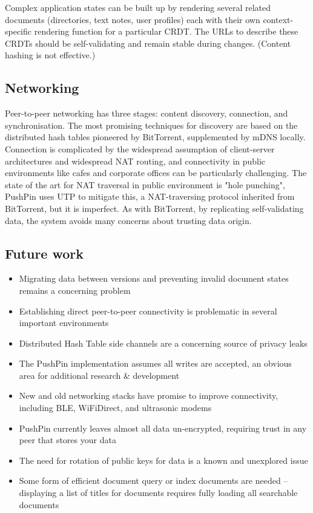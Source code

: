 \documentclass[sigplan,10pt]{acmart}
\begin{document}
Complex application states can be built up by rendering several related documents (directories, text notes, user profiles) each with their own context-specific rendering function for a particular CRDT. The URLs to describe these CRDTs should be self-validating and remain stable during changes. (Content hashing is not effective.)

\subsection{Networking}

Peer-to-peer networking has three stages: content discovery, connection, and synchronisation. The most promising techniques for discovery are based on the distributed hash tables pioneered by BitTorrent, supplemented by mDNS locally. Connection is complicated by the widespread assumption of client-server architectures and widespread NAT routing, and connectivity in public environments like cafes and corporate offices can be particularly challenging.  The state of the art for NAT traversal in public environment is "hole punching", PushPin uses UTP to mitigate this, a NAT-traversing protocol inherited from BitTorrent, but it is imperfect. As with BitTorrent, by replicating self-validating data, the system avoids many concerns about trusting data origin.


\subsection{Future work}
\begin{itemize}
    \item Migrating data between versions and preventing invalid document states remains a concerning problem
    \item Establishing direct peer-to-peer connectivity is problematic in several important environments
    \item Distributed Hash Table side channels are a concerning source of privacy leaks
    \item The PushPin implementation assumes all writes are accepted, an obvious area for additional research \& development
    \item New and old networking stacks have promise to improve connectivity, including BLE, WiFiDirect, and ultrasonic modems
    \item PushPin currently leaves almost all data un-encrypted, requiring trust in any peer that stores your data
    \item The need for rotation of public keys for data is a known and unexplored issue
    \item Some form of efficient document query or index documents are needed -- displaying a list of titles for documents requires fully loading all searchable documents
\end{itemize}
\end{document}
